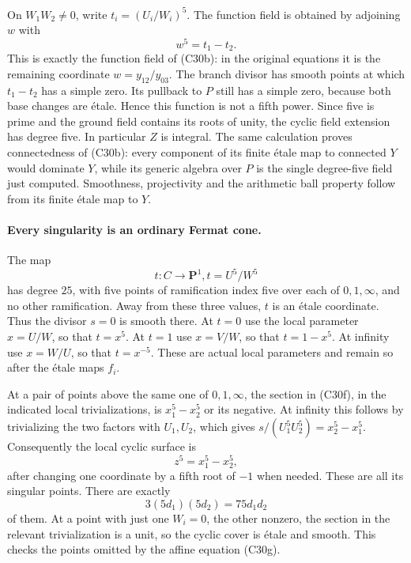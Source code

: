 \documentclass[11pt]{article}
\theoremstyle{definition}\newtheorem{definition}[theorem]{Definition}\newtheorem{remark}[theorem]{Remark}
\begin{document}
On $W_1W_2\ne0$, write $t_i=(U_i/W_i)^5$.
The function field is obtained by adjoining $w$ with
\[
                         w^5=t_1-t_2.
                                                        \tag{C30g}
\]
This is exactly the function field of (C30b): in the
original equations it is the remaining coordinate
$w=y_{12}/y_{03}$.  The branch divisor has smooth
points at which $t_1-t_2$ has a simple zero.  Its
pullback to $P$ still has a simple zero, because both
base changes are \'etale.  Hence this function is not
a fifth power.  Since five is prime and the ground
field contains its roots of unity, the cyclic field
extension has degree five.  In particular $Z$ is
integral.  The same calculation proves connectedness
of (C30b): every component of its finite \'etale map
to connected $Y$ would dominate $Y$, while its generic
algebra over $P$ is the single degree-five field just
computed.  Smoothness, projectivity and the arithmetic
ball property follow from its finite \'etale map to $Y$.

\paragraph{Every singularity is an ordinary Fermat cone.}
The map
\[
          t:C\longrightarrow\mathbf P^1,
                    t=U^5/W^5
\]
has degree $25$, with five points of ramification
index five over each of $0,1,\infty$, and no other
ramification.  Away from these three values, $t$ is
an \'etale coordinate.  Thus the divisor $s=0$ is
smooth there.  At $t=0$ use the local parameter
$x=U/W$, so that $t=x^5$.  At $t=1$ use
$x=V/W$, so that $t=1-x^5$.  At infinity use
$x=W/U$, so that $t=x^{-5}$.  These are actual local
parameters and remain so after the \'etale maps $f_i$.

At a pair of points above the same one of
$0,1,\infty$, the section in (C30f), in the indicated
local trivializations, is $x_1^5-x_2^5$ or its
negative.  At infinity this follows by trivializing
the two factors with $U_1,U_2$, which gives
$s/(U_1^5U_2^5)=x_2^5-x_1^5$.
Consequently the local cyclic surface is
\[
                       z^5=x_1^5-x_2^5,
                                                        \tag{C30h}
\]
after changing one coordinate by a fifth root of $-1$
when needed.  These are all its singular points.
There are exactly
\[
             3(5d_1)(5d_2)=75d_1d_2
                                                        \tag{C30i}
\]
of them.  At a point with just one $W_i=0$, the other
nonzero, the section in the relevant trivialization
is a unit, so the cyclic cover is \'etale and smooth.
This checks the points omitted by the affine equation
(C30g).
\end{document}

